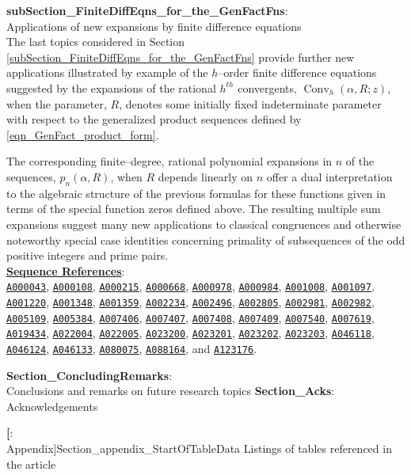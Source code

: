 \documentclass[12pt,reqno]{article}
\numberwithin{sfootnote}{section}
\numberwithin{equation}{section}
\newcommand{\itemlabel}[1]{\textbf{#1}: \\ }
\theoremstyle{DefaultTheoremStyle}
\theoremstyle{definition}
\newcommand{\seqnum}[1]{\href{http://oeis.org/#1}{\texttt{\underline{#1}}}}
\newcommand{\pn}[3]{\ensuremath{p_{#1}\left(#2, #3\right)}}
\newcommand{\ConvGF}[4]{\ensuremath{\Conv_{#1}\left(#2, #3; #4\right)}}
\DeclareMathOperator{\Conv}{Conv}
\begin{document}
\begin{enumerate}[leftmargin=\parindent,itemsep=-1mm]
\itemlabel{subSection_FiniteDiffEqns_for_the_GenFactFns}{ 
           Applications of new 
           expansions by finite difference equations} \\ 
The last topics considered in 
Section \ref{subSection_FiniteDiffEqns_for_the_GenFactFns} 
provide further new applications illustrated by example of the 
$h$--order finite difference equations suggested by the 
expansions of the rational $h^{th}$ convergents, 
$\ConvGF{h}{\alpha}{R}{z}$, when the parameter, $R$, 
denotes some initially fixed indeterminate parameter with respect to the 
generalized product sequences defined by \eqref{eqn_GenFact_product_form}. 

The corresponding finite--degree, rational polynomial expansions in $n$ of the 
sequences, $\pn{n}{\alpha}{R}$, when $R$ depends linearly on $n$ 
offer a dual interpretation to the algebraic structure of the 
previous formulas for these functions 
given in terms of the special function zeros 
defined above. 
The resulting multiple sum expansions suggest 
many new applications to classical congruences and otherwise 
noteworthy special case identities concerning primality of 
subsequences of the odd positive integers and prime pairs. \\ 
{ 
     \smaller
     \textbf{\underline{Sequence References}}: \\ 
     \seqnum{A000043}, \seqnum{A000108}, \seqnum{A000215}, \seqnum{A000668}, 
     \seqnum{A000978}, \seqnum{A000984}, \seqnum{A001008}, \seqnum{A001097}, 
     \seqnum{A001220}, \seqnum{A001348}, \seqnum{A001359}, \seqnum{A002234}, 
     \seqnum{A002496}, \seqnum{A002805}, \seqnum{A002981}, \seqnum{A002982}, 
     \seqnum{A005109}, \seqnum{A005384}, \seqnum{A007406}, \seqnum{A007407}, 
     \seqnum{A007408}, \seqnum{A007409}, \seqnum{A007540}, \seqnum{A007619}, 
     \seqnum{A019434}, \seqnum{A022004}, \seqnum{A022005}, \seqnum{A023200}, 
     \seqnum{A023201}, \seqnum{A023202}, \seqnum{A023203}, \seqnum{A046118}, 
     \seqnum{A046124}, \seqnum{A046133}, \seqnum{A080075}, \seqnum{A088164}, 
     and \seqnum{A123176}. 
} 

\itemlabel{Section_ConcludingRemarks}{Conclusions and 
           remarks on future research topics} 
\itemlabel{Section_Acks}{Acknowledgements} 

\itemlabel[Appendix]{Section_appendix_StartOfTableData}{ 
          Listings of tables referenced in the article}
\begin{enumerate}[leftmargin=\parindent,itemsep=-1mm] 
     \renewcommand{\itemlabel}[3][Section]{ 
          \item {\normalsize \textbf{\underline{#1 \ref{#2}}}.\ 
          \textrm{\textbf{#3}}.\ } 
     } 


\end{enumerate}
\end{enumerate}
\end{document}
